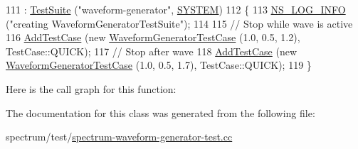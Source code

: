\begin{DoxyCode}
111   : \hyperlink{classns3_1_1TestSuite_a904b0c40583b744d30908aeb94636d1a}{TestSuite} (\textcolor{stringliteral}{"waveform-generator"}, \hyperlink{classns3_1_1TestSuite_a1ebfcab34ec8161e085e8e3a1855eae0a90c5529a26ab3a5ffcc6e57040dbd82e}{SYSTEM})
112 \{
113   \hyperlink{group__logging_gafbd73ee2cf9f26b319f49086d8e860fb}{NS\_LOG\_INFO} (\textcolor{stringliteral}{"creating WaveformGeneratorTestSuite"});
114 
115   \textcolor{comment}{// Stop while wave is active}
116   \hyperlink{classns3_1_1TestCase_a3718088e3eefd5d6454569d2e0ddd835}{AddTestCase} (\textcolor{keyword}{new} \hyperlink{classWaveformGeneratorTestCase}{WaveformGeneratorTestCase} (1.0, 0.5, 1.2), 
      TestCase::QUICK);
117   \textcolor{comment}{// Stop after wave}
118   \hyperlink{classns3_1_1TestCase_a3718088e3eefd5d6454569d2e0ddd835}{AddTestCase} (\textcolor{keyword}{new} \hyperlink{classWaveformGeneratorTestCase}{WaveformGeneratorTestCase} (1.0, 0.5, 1.7), 
      TestCase::QUICK);
119 \}
\end{DoxyCode}


Here is the call graph for this function\+:




The documentation for this class was generated from the following file\+:\begin{DoxyCompactItemize}
\item 
spectrum/test/\hyperlink{spectrum-waveform-generator-test_8cc}{spectrum-\/waveform-\/generator-\/test.\+cc}\end{DoxyCompactItemize}
